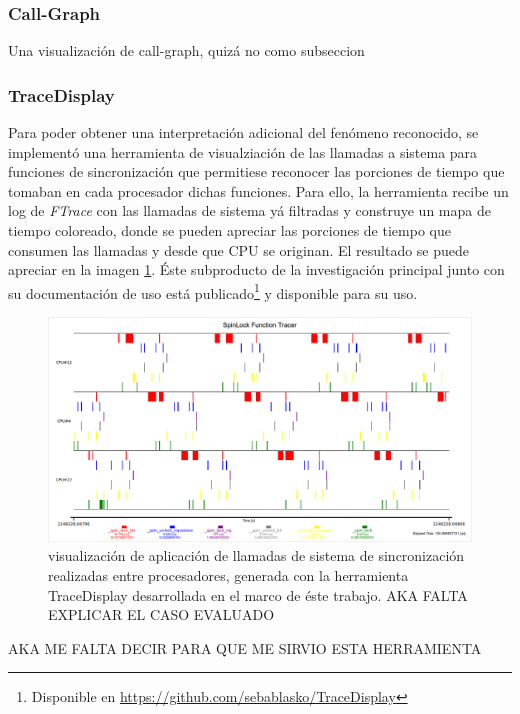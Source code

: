\subsubsection{Call-Graph}
Una visualización de call-graph, quizá no como subseccion

\subsubsection{TraceDisplay}
Para poder obtener una interpretación adicional del fenómeno reconocido, se implementó una herramienta de visualziación de las llamadas a sistema para funciones de sincronización que permitiese reconocer las porciones de tiempo que tomaban en cada procesador dichas funciones. Para ello, la herramienta recibe un log de \emph{FTrace} con las llamadas de sistema yá filtradas y construye un mapa de tiempo coloreado, donde se pueden apreciar las porciones de tiempo que consumen las llamadas y desde que CPU se originan. El resultado se puede apreciar en la imagen \ref{fig:traceDisplay}. Éste subproducto de la investigación principal junto con su documentación de uso está publicado\footnote{Disponible en \url{https://github.com/sebablasko/TraceDisplay}} y disponible para su uso.

\begin{figure}[!h]
	\centering
	\includegraphics[scale=0.35]{imagenes/traceVisualization.png}
	\caption{visualización de aplicación de llamadas de sistema de sincronización realizadas entre procesadores, generada con la herramienta TraceDisplay desarrollada en el marco de éste trabajo. AKA FALTA EXPLICAR EL CASO EVALUADO}
	\label{fig:traceDisplay}
\end{figure}

AKA ME FALTA DECIR PARA QUE ME SIRVIO ESTA HERRAMIENTA



